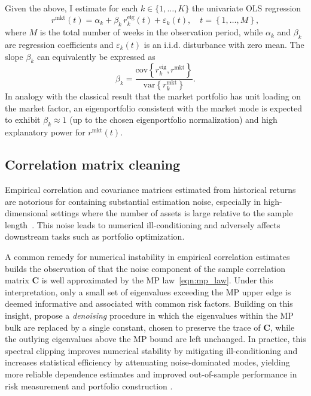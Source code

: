 \documentclass[pdflatex,sn-basic]{sn-jnl}%
\theoremstyle{thmstyleone}%
\theoremstyle{thmstyletwo}%
\theoremstyle{thmstylethree}%
\newcommand{\bC}{\boldsymbol{C}}
\newcommand{\figbrc}[1]{\left\{ #1 \right\} }
\begin{document}
Given the above, I estimate for each $k\in\{1,\ldots,K\}$ the univariate OLS regression
\begin{equation}
\label{eqn:method_market_factor_ols}
    r^{\textrm{mkt}}(t) = \alpha_k + \beta_k\, r^{\textrm{eig}}_k(t) + \varepsilon_k(t), \quad t = \figbrc{1,\ldots, M},
\end{equation}
where $M$ is the total number of weeks in the observation period, while $\alpha_k$ and $\beta_k$ are regression coefficients and $\varepsilon_k(t)$ is an i.i.d. disturbance with zero mean. The slope $\beta_k$ can equivalently be expressed as
\begin{equation}
\label{eqn:beta}
    \beta_k = \frac{\mathrm{cov}\figbrc{r^{\textrm{eig}}_k,r^{\textrm{mkt}}}}{\mathrm{var}\figbrc{r^{\textrm{mkt}}_k}}.
\end{equation}
In analogy with the classical result that the market portfolio has unit loading on the market factor, an eigenportfolio consistent with the market mode is expected to exhibit $\beta_k\approx 1$ (up to the chosen eigenportfolio normalization) and high explanatory power for $r^{\textrm{mkt}}(t)$. 

\subsection{Correlation matrix cleaning}
Empirical correlation and covariance matrices estimated from historical returns are notorious for containing substantial estimation noise, especially in high-dimensional settings where the number of assets is large relative to
the sample length~\citep[see][Ch.2]{deprado2020machine}. This noise leads to numerical ill-conditioning and adversely affects downstream tasks such as portfolio optimization. 

A common remedy for numerical instability in empirical correlation estimates builds the observation of \citet{laloux1999noise} that the noise component of the sample correlation matrix $\bC$ is well approximated by the MP law~\eqref{eqn:mp_law}. Under this interpretation, only a small set of eigenvalues exceeding the MP upper edge is deemed informative and associated with common risk factors. Building on this insight, \citet{laloux2000random} propose a \textit{denoising} procedure in which the eigenvalues within the MP bulk are replaced by a single constant, chosen to preserve the trace of $\bC$, while the outlying eigenvalues above the MP bound are left unchanged. In practice, this spectral clipping improves numerical stability by mitigating ill-conditioning and increases statistical efficiency by attenuating noise-dominated modes, yielding more reliable dependence estimates and improved out-of-sample performance in risk measurement and portfolio construction \citep{pafka2003noisy}.
\end{document}

